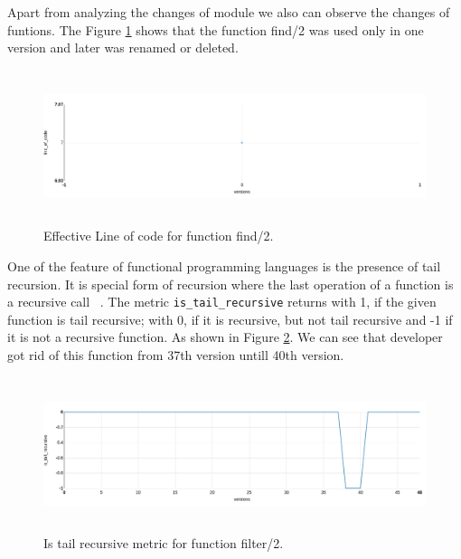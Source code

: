Apart from analyzing the changes of module we also can observe the changes of funtions. The Figure \ref{fig:find/2} shows that the function find/2 was used only in one version and later was renamed or deleted.

\begin{figure}[h]
	\centering
	\includegraphics[height=45mm]{figures/find2.png}
	\caption{Effective Line of code for function find/2.}
	\label{fig:find/2}
\end{figure}


One of the feature of functional programming languages is the presence of tail recursion. It is special form of recursion where the last operation of a function is a recursive call ~\cite{tail}.
The metric \texttt{is\_tail\_recursive} returns with 1, if the given function
is tail recursive; with 0, if it is recursive, but not tail recursive 
and -1 if it is not a recursive function. As shown in Figure \ref{fig:tail1}. 
We can see that developer got rid of this function from 37th version untill 40th version.

\begin{figure}[h]
	\centering
	\includegraphics[height=45mm]{figures/filter2.png}
	\caption{Is tail recursive metric for function filter/2.}
	\label{fig:tail1}
\end{figure}

